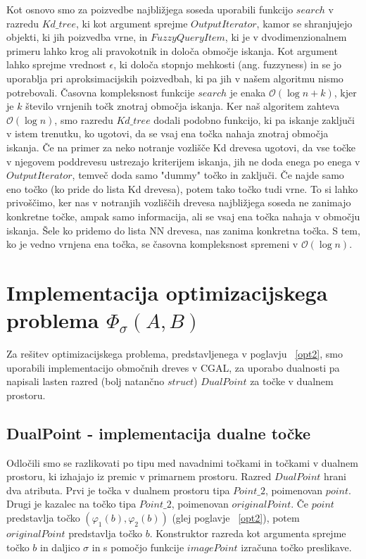 \documentclass[a4paper, 12pt]{book}
\newcommand{\OO}{\ensuremath{\mathcal{O}}} %
\begin{document}
Kot osnovo smo za poizvedbe najbližjega soseda uporabili funkcijo $search$ v razredu $Kd{\_}tree$, ki kot argument sprejme $OutputIterator$, kamor se shranjujejo objekti, ki jih poizvedba vrne, in $FuzzyQueryItem$, ki je v dvodimenzionalnem primeru lahko krog ali pravokotnik in določa območje iskanja. Kot argument lahko sprejme vrednost $\epsilon$, ki določa stopnjo mehkosti (ang. fuzzyness) in se jo uporablja pri aproksimacijskih poizvedbah, ki pa jih v našem algoritmu nismo potrebovali. Časovna kompleksnost funkcije $search$ je enaka $\OO(\log n + k)$, kjer je $k$ število vrnjenih točk znotraj območja iskanja. Ker naš algoritem zahteva $\OO(\log n)$, smo razredu $Kd{\_}tree$ dodali podobno funkcijo, ki pa iskanje zaključi v istem trenutku, ko ugotovi, da se vsaj ena točka nahaja znotraj območja iskanja. Če na primer za neko notranje vozlišče Kd drevesa ugotovi, da vse točke v njegovem poddrevesu ustrezajo kriterijem iskanja, jih ne doda enega po enega v $OutputIterator$, temveč doda samo "dummy" točko in zaključi. Če najde samo eno točko (ko pride do lista Kd drevesa), potem tako točko tudi vrne. To si lahko privoščimo, ker nas v notranjih vozliščih drevesa najbližjega soseda ne zanimajo konkretne točke, ampak samo informacija, ali se vsaj ena točka nahaja v območju iskanja. Šele ko pridemo do lista NN drevesa, nas zanima konkretna točka. S tem, ko je vedno vrnjena ena točka, se časovna kompleksnost spremeni v $\OO(\log n)$.

\section{Implementacija optimizacijskega problema $\Phi_\sigma(A,B)$}

Za rešitev optimizacijskega problema, predstavljenega v poglavju ~\ref{opt2}, smo uporabili implementacijo območnih dreves v CGAL, za uporabo dualnosti pa napisali lasten razred (bolj natančno $struct$) $DualPoint$ za točke v dualnem prostoru.

\subsection{DualPoint - implementacija dualne točke}

Odločili smo se razlikovati po tipu med navadnimi točkami in točkami v dualnem prostoru, ki izhajajo iz premic v primarnem prostoru. Razred $DualPoint$ hrani dva atributa. Prvi je točka v dualnem prostoru tipa $Point\texttt{\_}2$, poimenovan $point$. Drugi je kazalec na točko tipa $Point\texttt{\_}2$, poimenovan $originalPoint$. Če $point$ predstavlja točko $(\varphi_1(b), \varphi_2(b))$ (glej poglavje ~\ref{opt2}), potem $originalPoint$ predstavlja točko $b$. Konstruktor razreda kot argumenta sprejme točko $b$ in daljico $\sigma$ in s pomočjo funkcije $imagePoint$ izračuna točko preslikave.
\end{document}
